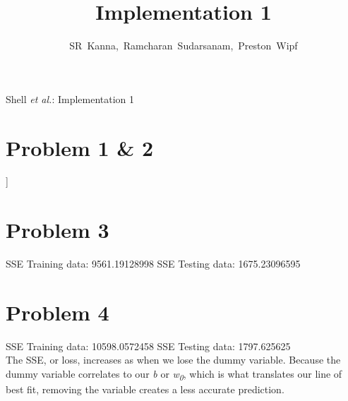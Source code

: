 \documentclass[journal]{IEEEtran}
\begin{document}
\onecolumn

\title{Implementation 1}
\author{SR~Kanna,~Ramcharan~Sudarsanam,~Preston~Wipf}%

%
{Shell \MakeLowercase{\textit{et al.}}: Implementation 1}

\maketitle
\bigskip



\section{Problem 1 \& 2}
\noindent [[  3.95843212e+01] \newline
\noindent [ -1.01137046e-01] \newline
\noindent [  4.58935299e-02] \newline
\noindent [ -2.73038670e-03] \newline
\noindent [  3.07201340e+00] \newline
\noindent [ -1.72254072e+01] \newline
\noindent [  3.71125235e+00] \newline
\noindent [  7.15862492e-03] \newline
\noindent [ -1.59900210e+00] \newline
\noindent [  3.73623375e-01] \newline
\noindent [ -1.57564197e-02] \newline
\noindent [ -1.02417703e+00] \newline
\noindent [  9.69321451e-03] \newline
\noindent [ -5.85969273e-01]] \newline
\medskip

\section{Problem 3}
\noindent SSE Training data: 9561.19128998 \newline
\noindent SSE Testing data:  1675.23096595 \newline
\medskip

\section{Problem 4}
\noindent SSE Training data: 10598.0572458 \newline
\noindent SSE Testing data:  1797.625625 \newline \\
\noindent The SSE, or loss, increases as when we lose the dummy variable.
Because the dummy variable correlates to our \textit{b} or \textit{w\textsubscript{0}},
which is what translates our line of best fit, removing the variable creates a less
accurate prediction. \newline
\newpage
\end{document}
